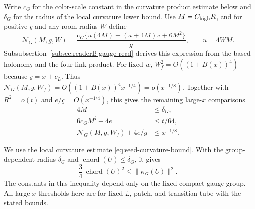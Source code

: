 Write $c_G$ for the color-scale constant in the curvature product estimate
below and $\delta_G$ for the radius of the local curvature lower bound.
Use $M=C_{\rm high}R$, and for positive $g$ and any room radius $W$ define
\begin{equation}\label{eq:readerB-transport-cost}
 \mathcal N_G(M,g,W)
 =\frac{c_G\{u(4M)+(u+4M)u+6M^2\}}{g},
 \qquad u=4WM.
\end{equation}
Subsubsection~\ref{subsec:readerB-gauge-read} derives this expression from the
based holonomy and the four-link product. For fixed $w$,
$W_f^2=O((1+B(x))^4)$ because $y=x+c_L$. Thus
$\mathcal N_G(M,g,W_f)=O((1+B(x))^4x^{-1/4})=o(x^{-1/8})$.
Together with $R^2=o(t)$ and $e/g=O(x^{-1/4})$, this gives the remaining
large-$x$ comparisons
\begin{align}
 4M&\le\delta_G,\label{eq:readerB-small-chart}\\
 6c_G M^2+4e&\le t/64,\label{eq:readerB-four-budget}\\
 \mathcal N_G(M,g,W_f)+4e/g&\le x^{-1/8}.\label{eq:readerB-nautical}
\end{align}

We use the local curvature estimate \eqref{eq:seed-curvature-bound}.
With the group-dependent radius $\delta_G$ and
$\operatorname{chord}(U)\le\delta_G$, it gives
\[
 \frac34\,\operatorname{chord}(U)^2
       \leq\|\kappa_G(U)\|^2.
\]
The constants in this inequality depend only on the fixed compact
gauge group. All large-$x$ thresholds here are for fixed $L$, patch,
and transition tube with the stated bounds.

